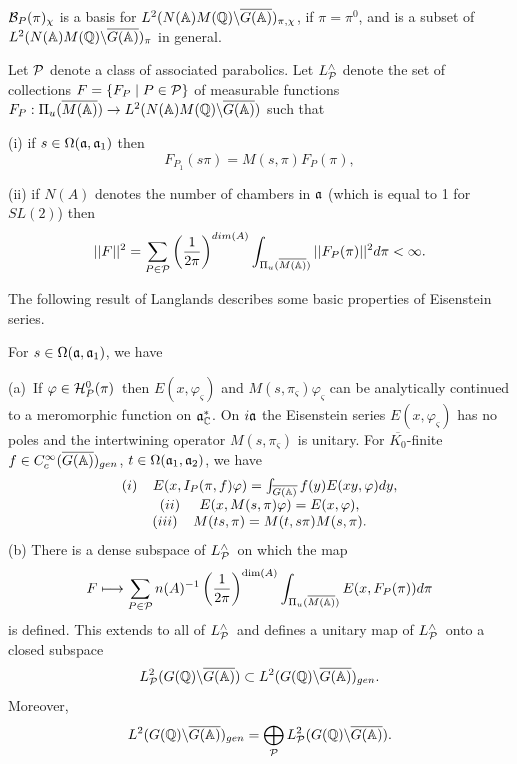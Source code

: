 ${\cal B}_P(\pi)_\chi$ is a basis for
$L^2(N({\Bbb{A}})M({\Bbb{Q}})\backslash \overline{G({\Bbb{A}})})_{\pi,\chi}$,
if $\pi=\pi^0$, and is a subset of
$L^2(N({\Bbb{A}})M({\Bbb{Q}})\backslash \overline{G({\Bbb{A}})})_\pi$
in general.

Let ${\cal P}$ denote a class of associated parabolics. Let
$L_{{\cal P}}^{\wedge }$ denote the
set of collections $F=\{F_P\;|\;P\in {\cal P}\}$ of
measurable functions
$F_P:\Pi _u(\overline{M({\Bbb{A}})})\rightarrow
L^2(N({\Bbb{A}})M({\Bbb{Q}})\backslash \overline{G({\Bbb{A}})})$ such
that

(i) if $s\in \Omega ({\frak{a}},{\frak{a}}_1)$ then 
\[
F_{P_1}(s\pi )=M(s,\pi )F_P(\pi ),
\]

(ii) if $N(A)$ denotes the number of chambers in ${\frak{a}}$
(which is equal to 1 for $SL(2)$) then 
\[
||F||^2=\sum_{P\in {\cal{P}}}{\left({1\over 2\pi }\right)}^{dim(A)}
\int_{\Pi _u(\overline{M({\Bbb{A}})})}
||F_P(\pi )||^2d\pi <\infty .
\]

The following result of Langlands
describes some basic properties of Eisenstein series.

\begin{theorem} For
$s\in \Omega ({\frak{a}},{\frak{a}}_1)$, we have

(a)\ If $\varphi \in {\cal H}_P^0(\pi )$\ then
$E(x,\varphi _\varsigma )$ and
$M(s,\pi _\varsigma )\varphi _\varsigma $
can be analytically continued
to a meromorphic function on ${\frak{a}}_{{\Bbb C}}^{*}$. On 
$i{\frak{a}}$ the
Eisenstein series $E(x,\varphi_\varsigma )$
has no poles and the intertwining operator $M(s,\pi_\varsigma )$
is unitary. For $\overline{K_0}$-finite
$f\in C_c^\infty (\overline{G({\Bbb{A}})})_{gen}$,
$t\in \Omega ({\frak{a}}_1,{\frak{a}}_2)$, we have 
\[
\begin{array}{c}
(i)\;\;\;\;E(x,I_P(\pi ,f)\varphi )
=\int_{\overline{G({\Bbb{A}})}}f(y)E(xy,\varphi )dy,
\\ 
(ii)\;\;\;\;\;E(x,M(s,\pi )\varphi )=E(x,\varphi ), \\ 
(iii)\;\;\;\;M(ts,\pi )=M(t,s\pi )M(s,\pi ).
\end{array}
\]
(b) There is a dense subspace of $L_{{\cal P}}^{\wedge }$\ on which the map 
\[
F\longmapsto \sum_{P\in {\cal P}}n(A)^{-1}
\left( \frac 1{2\pi }\right)^{\dim (A)}
\int_{\Pi _u(\overline{M({\Bbb{A}})})}E(x,F_P(\pi ))d\pi 
\]
is defined. This extends to all of $L_{{\cal P}}^{\wedge }$\ and defines a
unitary map of $L_{{\cal P}}^{\wedge }$\ onto a closed subspace 
\[
L_{{\cal P}}^2(G({{\Bbb{Q}}})\backslash \overline{G({\Bbb{A}})})
\subset L^2(G({\Bbb{Q}})\backslash \overline{G({\Bbb{A}})})_{gen}.
\]
Moreover, 
\[
L^2(G({\Bbb{Q}})\backslash \overline{G({\Bbb{A}})})_{gen}
=\bigoplus_{\cal{P}}
L_{\cal{P}}^2(G({\Bbb{Q}})\backslash \overline{G({\Bbb{A}})}).
\]
\end{theorem}

